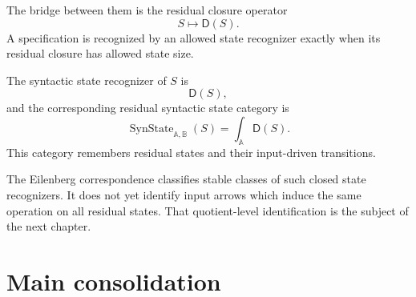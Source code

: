 The bridge between them is the residual closure operator
\[
S\longmapsto \mathsf D(S).
\]
A specification is recognized by an allowed state recognizer exactly when its
residual closure has allowed state size.

The syntactic state recognizer of \(S\) is
\[
\mathsf D(S),
\]
and the corresponding residual syntactic state category is
\[
\operatorname{SynState}_{\mathbb A,\mathbb B}(S)
=
\int_{\mathbb A}\mathsf D(S).
\]
This category remembers residual states and their input-driven transitions.

The Eilenberg correspondence classifies stable classes of such closed state
recognizers. It does not yet identify input arrows which induce the same
operation on all residual states. That quotient-level identification is the
subject of the next chapter.

\section{Main consolidation}
\label{sec:state-eilenberg-main-consolidation}

